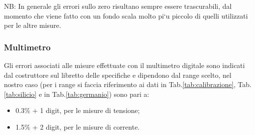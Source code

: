 \documentclass[a4paper, 11pt]{article}
\begin{document}
NB: In generale gli errori sullo zero risultano sempre essere trascurabili, dal momento che viene fatto con un fondo scala molto pi`u piccolo di quelli utilizzati per le altre misure.

\subsubsection{Multimetro}
Gli errori associati alle misure effettuate con il multimetro digitale sono indicati dal costruttore sul libretto delle specifiche e dipendono dal range scelto, nel nostro caso (per i range si faccia riferimento ai dati in Tab.\ref{tab:calibrazione}, Tab.\ref{tab:silicio} e in Tab.\ref{tab:germanio}) sono pari a:
\begin{itemize}
    \item 0.3\% + 1 digit, per le misure di tensione;
    \item 1.5\% + 2 digit, per le misure di corrente.
\end{itemize}
\end{document}
